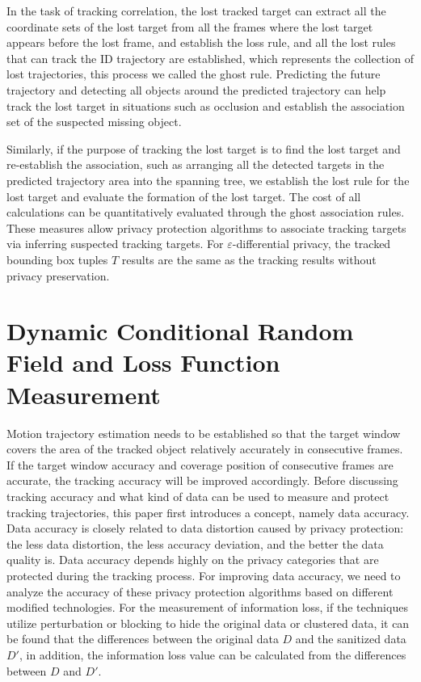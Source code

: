 \documentclass[trans]{IEEEtran}
\newcommand{\el}[1]{{\color{black}#1}}
\begin{document}
\el{ In the task of tracking correlation, the lost tracked target can extract all the coordinate sets of the lost target from all the frames where the lost target appears before the lost frame, and establish the loss rule, and all the lost rules that can track the ID trajectory are established, which represents the collection of lost trajectories, this process we called the ghost rule.} Predicting the future trajectory and detecting all objects around the predicted trajectory can help track the lost target in situations such as occlusion and establish the association set of the suspected missing object.

Similarly, if the purpose of tracking the lost target is to find the lost target and re-establish the association, \el{ such as arranging all the detected targets in the predicted trajectory area into the spanning tree, we establish the lost rule for the lost target and evaluate the formation of the lost target. The cost of all calculations can be quantitatively evaluated through the ghost association rules. These measures allow privacy protection algorithms to associate tracking targets via inferring suspected tracking targets. For $\varepsilon$-differential privacy, the tracked bounding box tuples $T$ results are the same as the tracking results without privacy preservation.}

\section{Dynamic Conditional Random Field and Loss Function Measurement} \label{informationlossmodel}
Motion trajectory estimation needs to be established so that the target window covers the area of the tracked object relatively accurately in consecutive frames. If the target window accuracy and coverage position of consecutive frames are accurate, the tracking accuracy will be improved accordingly. Before discussing tracking accuracy and what kind of data can be used to measure and protect tracking trajectories, this paper first introduces a concept, namely data accuracy. Data accuracy is closely related to data distortion caused by privacy protection: the less data distortion, the less accuracy deviation, and the better the data quality is. Data accuracy depends highly on the privacy categories that are protected during the tracking process. For improving data accuracy, we need to analyze the accuracy of these privacy protection algorithms based on different modified technologies. For the measurement of information loss, if the techniques utilize perturbation or blocking to hide the original data or clustered data, it can be found that the differences between the original data $D$ and the sanitized data $D'$, in addition, the information loss value can be calculated from the differences between  $D$ and  $D'$.
\end{document}
